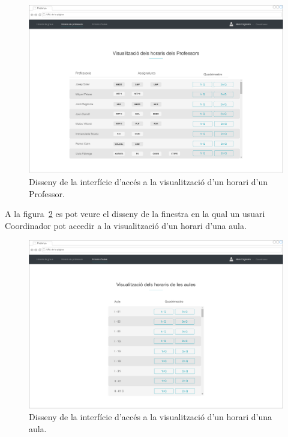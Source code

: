 \documentclass[a4paper,12pt]{ThesisStyle}
\begin{document}
\begin{figure}[H]
	\centering
	\includegraphics[width=\textwidth]{assets/interfaces/horaris/seleccioProfessor.pdf}
	\caption{\label{img:horaris_seleccioProfessor}Disseny de la interfície d'accés a la visualització d'un horari d'un Professor.}
\end{figure}

\newpage

A la figura~\ref{img:horaris_seleccioAula} es pot veure el disseny de la finestra en la qual un usuari Coordinador pot accedir a la visualització d'un horari d'una aula.

\begin{figure}[H]
	\centering
	\includegraphics[width=\textwidth]{assets/interfaces/horaris/seleccioAula.pdf}
	\caption{\label{img:horaris_seleccioAula}Disseny de la interfície d'accés a la visualització d'un horari d'una aula.}
\end{figure}
\end{document}
